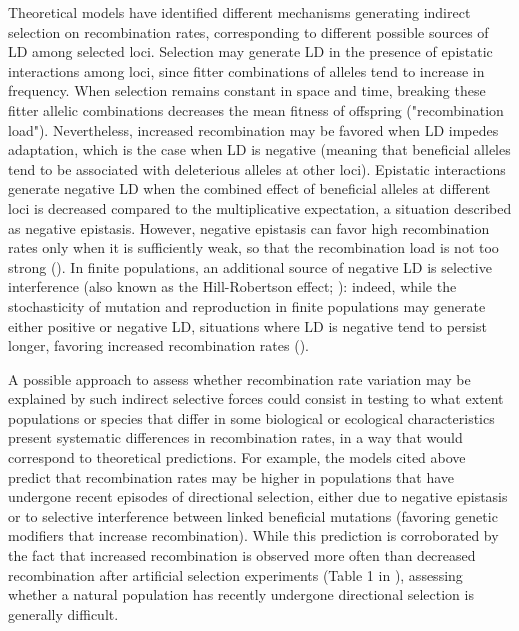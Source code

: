 \documentclass{article}
\begin{document}
Theoretical models have identified different mechanisms generating indirect selection on recombination rates, corresponding to different possible sources of LD among selected loci. Selection may generate LD in the presence of epistatic interactions among loci, since fitter combinations of alleles tend to increase in frequency. When selection remains constant in space and time, breaking these fitter allelic combinations decreases the mean fitness of offspring ("recombination load"). Nevertheless, increased recombination may be favored when LD impedes adaptation, which is the case when LD is negative (meaning that beneficial alleles tend to be associated with deleterious alleles at other loci). Epistatic interactions generate negative LD when the combined effect of beneficial alleles at different loci is decreased compared to the multiplicative expectation, a situation described as negative epistasis. However, negative epistasis can favor high recombination rates only when it is sufficiently weak, so that the recombination load is not too strong (\cite{bartonGeneralModelEvolution1995}). In finite populations, an additional source of negative LD is selective interference (also known as the Hill-Robertson effect; \cite{hillEffectLinkageLimits1966,felsensteinEvolutionaryAdvantageRecombination1974}): indeed, while the stochasticity of mutation and reproduction in finite populations may generate either positive or negative LD, situations where LD is negative tend to persist longer, favoring increased recombination rates (\cite{felsenstein1976evolutionary,barton2005evolution,keightley2006interference,hartfieldRoleAdvantageousMutations2010,rozeSimpleExpressionStrength2021,bergman1995evolution}).



A possible approach to assess whether recombination rate variation may be explained by such indirect selective forces could consist in testing to what extent populations or species that differ in some biological or ecological characteristics present systematic differences in recombination rates, in a way that would correspond to theoretical predictions. For example, the models cited above predict that recombination rates may be higher in populations that have undergone recent episodes of directional selection, either due to negative epistasis or to selective interference between linked beneficial mutations (favoring genetic modifiers that increase recombination). While this prediction is corroborated by the fact that increased recombination is observed more often than decreased recombination after artificial selection experiments (Table 1 in \cite{ottoSelectionRecombinationSmall2001}), assessing whether a natural population has recently undergone directional selection is generally difficult.
\end{document}
